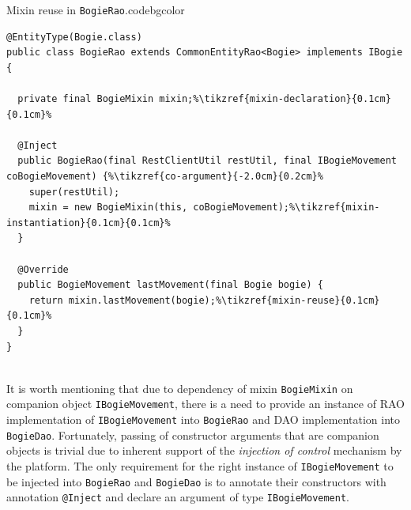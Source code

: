   \begin{code}{Mixin reuse in \texttt{BogieRao}.}{\label{lst:ch02:00:BogieRao-mixin}}{codebgcolor}
  \begin{lstlisting}
@EntityType(Bogie.class)
public class BogieRao extends CommonEntityRao<Bogie> implements IBogie {
  
  private final BogieMixin mixin;%\tikzref{mixin-declaration}{0.1cm}{0.1cm}%
  
  @Inject
  public BogieRao(final RestClientUtil restUtil, final IBogieMovement coBogieMovement) {%\tikzref{co-argument}{-2.0cm}{0.2cm}%
    super(restUtil);
    mixin = new BogieMixin(this, coBogieMovement);%\tikzref{mixin-instantiation}{0.1cm}{0.1cm}%
  }

  @Override
  public BogieMovement lastMovement(final Bogie bogie) { 
    return mixin.lastMovement(bogie);%\tikzref{mixin-reuse}{0.1cm}{0.1cm}%
  }
}
  
  \end{lstlisting}
\end{code}  

  It is worth mentioning that due to dependency of mixin \texttt{BogieMixin} on companion object \texttt{IBogieMovement}, there is a need to provide an instance of RAO implementation of \texttt{IBogieMovement} into \texttt{BogieRao} and DAO implementation into \texttt{BogieDao}.
  Fortunately, passing of constructor arguments that are companion objects is trivial due to inherent support of the \emph{injection of control} mechanism by the platform.
  The only requirement for the right instance of \texttt{IBogieMovement} to be injected into \texttt{BogieRao} and \texttt{BogieDao} is to annotate their constructors with annotation \texttt{@Inject} and declare an argument of type \texttt{IBogieMovement}.

